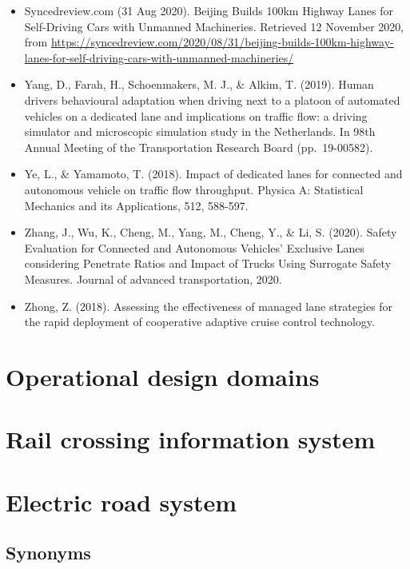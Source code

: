 \documentclass[
]{book}
\begin{document}
\begin{itemize}
\item
  Syncedreview.com (31 Aug 2020). Beijing Builds 100km Highway Lanes for Self-Driving Cars with Unmanned Machineries. Retrieved 12 November 2020, from \url{https://syncedreview.com/2020/08/31/beijing-builds-100km-highway-lanes-for-self-driving-cars-with-unmanned-machineries/}
\item
  Yang, D., Farah, H., Schoenmakers, M. J., \& Alkim, T. (2019). Human drivers behavioural adaptation when driving next to a platoon of automated vehicles on a dedicated lane and implications on traffic flow: a driving simulator and microscopic simulation study in the Netherlands. In 98th Annual Meeting of the Transportation Research Board (pp.~19-00582).
\item
  Ye, L., \& Yamamoto, T. (2018). Impact of dedicated lanes for connected and autonomous vehicle on traffic flow throughput. Physica A: Statistical Mechanics and its Applications, 512, 588-597.
\item
  Zhang, J., Wu, K., Cheng, M., Yang, M., Cheng, Y., \& Li, S. (2020). Safety Evaluation for Connected and Autonomous Vehicles' Exclusive Lanes considering Penetrate Ratios and Impact of Trucks Using Surrogate Safety Measures. Journal of advanced transportation, 2020.
\item
  Zhong, Z. (2018). Assessing the effectiveness of managed lane strategies for the rapid deployment of cooperative adaptive cruise control technology.
\end{itemize}

\hypertarget{ODD}{%
\section{Operational design domains}\label{ODD}}

\hypertarget{rail_crossing_info_system}{%
\section{Rail crossing information system}\label{rail_crossing_info_system}}

\hypertarget{ers}{%
\section{Electric road system}\label{ers}}

\hypertarget{synonyms-1}{%
\subsection*{Synonyms}\label{synonyms-1}}
\end{document}
